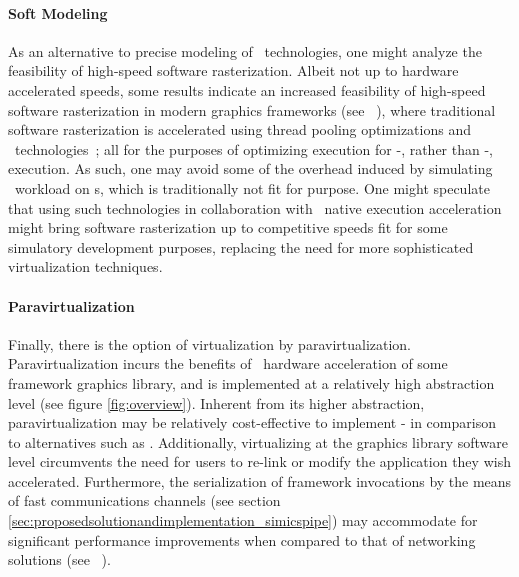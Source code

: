 \paragraph{Soft Modeling}
\label{par:backgroundandrelatedwork_graphicsvirtualization_softmodeling}
As an alternative to precise modeling of \dvttermgpu\ technologies, one might analyze the feasibility of high-speed software rasterization.
Albeit not up to hardware accelerated speeds, some results indicate an increased feasibility of high-speed software rasterization in modern graphics frameworks (see ~), where traditional software rasterization is accelerated using thread pooling optimizations and \dvttermsimd\ technologies~; all for the purposes of optimizing execution for \dvttermcpu -, rather than \dvttermgpu -, execution.
As such, one may avoid some of the overhead induced by simulating \dvttermgpu\ workload on \dvttermcpu s, which is traditionally not fit for purpose.
One might speculate that using such technologies in collaboration with \dvttermhost\ native execution acceleration might bring software rasterization up to competitive speeds fit for some simulatory development purposes, replacing the need for more sophisticated virtualization techniques.

\paragraph{Paravirtualization}
\label{par:backgroundandrelatedwork_graphicsvirtualization_paravirtualization}
Finally, there is the option of virtualization by paravirtualization.
Paravirtualization incurs the benefits of \dvttermhost\ hardware acceleration of some framework graphics library, and is implemented at a relatively high abstraction level (see figure \ref{fig:overview}).
Inherent from its higher abstraction, paravirtualization may be relatively cost-effective to implement - in comparison to alternatives such as .
Additionally, virtualizing at the graphics library software level circumvents the need for users to re-link or modify the application they wish accelerated.
Furthermore, the serialization of framework invocations by the means of fast communications channels (see section \ref{sec:proposedsolutionandimplementation_simicspipe}) may accommodate for significant performance improvements when compared to that of networking solutions (see ~).

